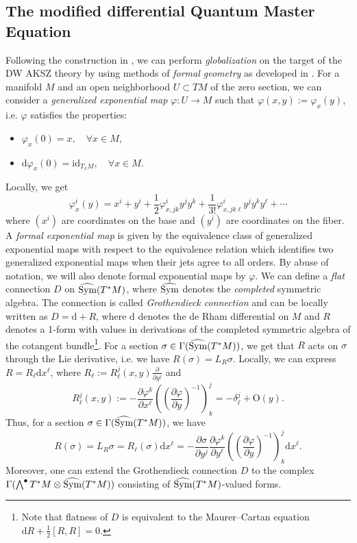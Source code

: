 \documentclass[11pt,colorinlistoftodos]{amsart}
\numberwithin{equation}{subsection}
\theoremstyle{plain}
\theoremstyle{definition}
\theoremstyle{remark}
\newcommand{\dd}{{\mathrm{d}}}
\newcommand{\id}{\mathrm{id}}
\newcommand{\de}{\partial}
\newcommand{\Sym}{\textnormal{Sym}}
\begin{document}
\subsection{The modified differential Quantum Master Equation}
Following the construction in \cite{CMW4}, we can perform \emph{globalization} on the target of the DW AKSZ theory by using methods of \emph{formal geometry} as developed in \cite{GelfandFuks1969,GelfandFuks1970,GK,B}. For a manifold $M$ and an open neighborhood $U\subset TM$ of the zero section, we can consider a \emph{generalized exponential map} $\varphi\colon U\to M$ such that $\varphi(x,y):=\varphi_x(y)$, i.e. $\varphi$ satisfies the properties:
\begin{itemize}
    \item $\varphi_x(0)=x,\quad \forall x\in M$,
    \item $\dd\varphi_x(0)=\id_{T_xM},\quad \forall x\in M$.
\end{itemize}
Locally, we get 
\begin{equation}
    \label{eq:local_generalized_exponential_map}
    \varphi_x^i(y)=x^i+y^i+\frac{1}{2}\varphi^i_{x,jk}y^jy^k+\frac{1}{3!}\varphi^i_{x,jk\ell}y^jy^ky^\ell+\dotsm
\end{equation}
where $(x^i)$ are coordinates on the base and $(y^i)$ are coordinates on the fiber. A \emph{formal exponential map} is given by the equivalence class of generalized exponential maps with respect to the equivalence relation which identifies two generalized exponential maps when their jets agree to all orders. By abuse of notation, we will also denote formal exponential maps by $\varphi$. 
We can define a \emph{flat} connection $D$ on $\widehat{\Sym}(T^*M)$, where $\widehat{\Sym}$ denotes the \emph{completed} symmetric algebra. The connection is called \emph{Grothendieck connection} \cite{Grothendieck1968} and can be locally written as $D=\dd+R$, where $\dd$ denotes the de Rham differential on $M$ and $R$ denotes a 1-form with values in derivations of the completed symmetric algebra of the cotangent bundle\footnote{Note that flatness of $D$ is equivalent to the Maurer--Cartan equation $\dd R+\frac{1}{2}[R,R]=0$.}. For a section $\sigma\in\Gamma(\widehat{\Sym}(T^*M))$, we get that $R$ acts on $\sigma$ through the Lie derivative, i.e. we have  $R(\sigma)=L_R\sigma$. Locally, we can express $R=R_\ell\dd x^\ell$, where $R_\ell:=R^j_\ell(x,y)\frac{\de}{\de y^j}$ and 
\[
R^j_\ell(x,y):=-\frac{\de\varphi^k}{\de x^\ell}\left(\left(\frac{\de\varphi}{\de y}\right)^{-1}\right)^j_k=-\delta_\ell^j+\mathrm{O}(y).
\]
Thus, for a section $\sigma\in \Gamma(\widehat{\Sym}(T^*M))$, we have
\[
R(\sigma)=L_R\sigma=R_\ell(\sigma)\dd x^\ell=-\frac{\de\sigma}{\de y^j}\frac{\de\varphi^k}{\de y^\ell}\left(\left(\frac{\de\varphi}{\de y}\right)^{-1}\right)^j_k\dd x^\ell. 
\]
Moreover, one can extend the Grothendieck connection $D$ to the complex $\Gamma(\bigwedge^\bullet T^*M\otimes \widehat{\Sym}(T^*M))$ consisting of $\widehat{\Sym}(T^*M)$-valued forms.
\end{document}
